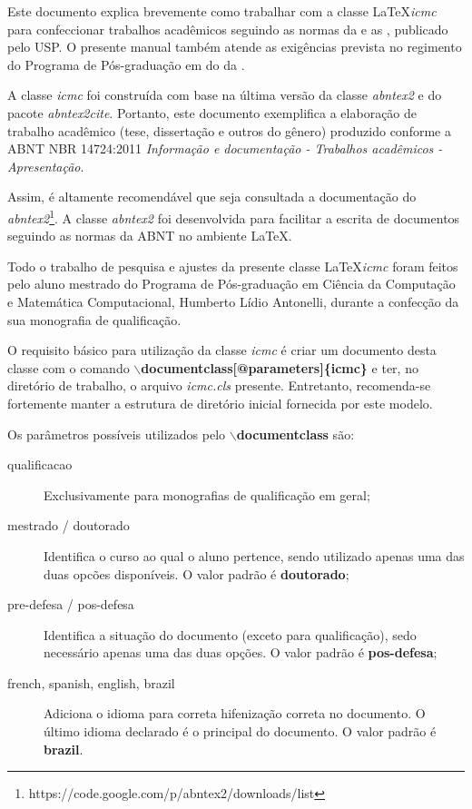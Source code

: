 \newcommand{\comando}[1]{\textbf{$\backslash$#1}}

Este documento explica brevemente como trabalhar com a classe \LaTeX \textit{icmc} para confeccionar trabalhos acadêmicos seguindo as normas da  e as , publicado pelo  USP. O presente manual também atende as exigências prevista no regimento do Programa de Pós-graduação em  do  da .


A classe \textit{icmc} foi construída com base na última versão da classe \textit{abntex2} e do pacote \textit{abntex2cite}. Portanto, este documento exemplifica a elaboração de trabalho
acadêmico (tese, dissertação e outros do gênero) produzido conforme a ABNT NBR
14724:2011 \textit{Informação e documentação - Trabalhos acadêmicos - Apresentação}.

Assim, é altamente recomendável que seja consultada a documentação do \textit{abntex2}\footnote{https://code.google.com/p/abntex2/downloads/list}. A classe \textit{abntex2} foi desenvolvida para facilitar a escrita de documentos seguindo as normas da ABNT no ambiente \LaTeX\;\cite{frasson:2005:classe_abnt}.

Todo o trabalho de pesquisa e ajustes da presente classe \LaTeX \emph{icmc} foram feitos pelo aluno mestrado do Programa de Pós-graduação em Ciência da Computação e Matemática Computacional, Humberto Lídio Antonelli, durante a confecção da sua monografia de qualificação.

O requisito básico para utilização da classe \textit{icmc} é criar um documento desta classe com o comando
\comando{documentclass[@parameters]\{icmc\}} e ter, no diretório de trabalho, o arquivo \emph{icmc.cls} presente. Entretanto, recomenda-se fortemente manter a estrutura de diretório inicial fornecida por este modelo.

Os parâmetros possíveis utilizados pelo \comando{documentclass} são:
\begin{description}
\item[qualificacao] Exclusivamente para monografias de qualificação em geral;
\item[mestrado / doutorado] Identifica o curso ao qual o aluno pertence, sendo utilizado apenas uma das duas opcões disponíveis. O valor padrão é \textbf{doutorado};
\item[pre-defesa / pos-defesa] Identifica a situação do documento (exceto para qualificação), sedo necessário apenas uma das duas opções. O valor padrão é \textbf{pos-defesa};
\item[french, spanish, english, brazil] Adiciona o idioma para correta hifenização correta no documento. O último idioma declarado é o principal do documento. O valor padrão é \textbf{brazil}.
\end{description}